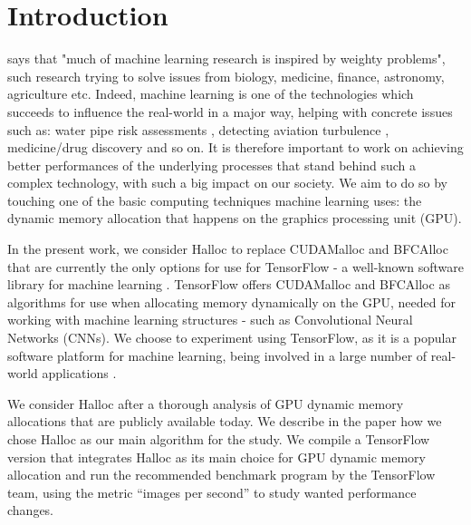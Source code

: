 \documentclass[12pt,twoside]{article}
\begin{document}

\section{Introduction}
\label{sec:introduction}

\citeauthor{mach-learning-matters} \cite{mach-learning-matters} says that "much of machine learning research is inspired by weighty problems", such research trying to solve issues from biology, medicine, finance, astronomy, agriculture etc. Indeed, machine learning is one of the technologies which succeeds to influence the real-world in a major way, helping with concrete issues such as: water pipe risk assessments \cite{water-pipe-risk}, detecting aviation turbulence \cite{aviation-turbulence}, medicine/drug discovery \cite{drug-discovery} and so on. It is therefore important to work on achieving better performances of the underlying processes that stand behind such a complex technology, with such a big impact on our society. We aim to do so by touching one of the basic computing techniques machine learning uses: the dynamic memory allocation that happens on the graphics processing unit (GPU). 

In the present work, we consider Halloc \cite{halloc-paper} to replace CUDAMalloc and BFCAlloc that are currently the only options for use for TensorFlow - a well-known software library for machine learning \cite{tensorflow-main-paper}. TensorFlow offers CUDAMalloc and BFCAlloc as algorithms for use when allocating memory dynamically on the GPU, needed for working with machine learning structures - such as Convolutional Neural Networks (CNNs). We choose to experiment using TensorFlow, as it is a popular software platform for machine learning, being involved in a large number of real-world applications \cite{drug-discovery} \cite{brain-tumor-detection} \cite{security-system}. 

We consider Halloc after a thorough analysis of GPU dynamic memory allocations that are publicly available today. We describe in the paper how we chose Halloc as our main algorithm for the study. We compile a TensorFlow version that integrates Halloc as its main choice for GPU dynamic memory allocation and run the recommended benchmark program by the TensorFlow team, using the metric “images per second” to study wanted performance changes.
\end{document}
